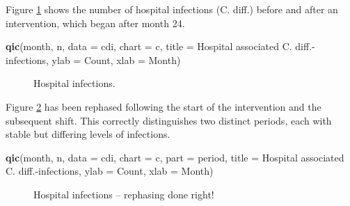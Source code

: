 \documentclass[
]{book}
\makeatletter
\newenvironment{Shaded}{\begin{snugshade}}{\end{snugshade}}
\newcommand{\AttributeTok}[1]{\textcolor[rgb]{0.13,0.29,0.53}{#1}}
\newcommand{\FunctionTok}[1]{\textcolor[rgb]{0.13,0.29,0.53}{\textbf{#1}}}
\newcommand{\NormalTok}[1]{#1}
\newcommand{\StringTok}[1]{\textcolor[rgb]{0.31,0.60,0.02}{#1}}
\newcommand*\pandocbounded[1]{%
  \sbox\pandoc@box{#1}%
  \Gscale@div\@tempa{\textheight}{\dimexpr\ht\pandoc@box+\dp\pandoc@box\relax}%
  \Gscale@div\@tempb{\linewidth}{\wd\pandoc@box}%
  \ifdim\@tempb\p@<\@tempa\p@\let\@tempa\@tempb\fi%
  \ifdim\@tempa\p@<\p@\scalebox{\@tempa}{\usebox\pandoc@box}%
  \else\usebox{\pandoc@box}%
  \fi%
}
\makeatother
\begin{document}
Figure \ref{fig:pitfalls-fig1} shows the number of hospital infections (C. diff.) before and after an intervention, which began after month 24.

\begin{Shaded}
\begin{Highlighting}[]
\FunctionTok{qic}\NormalTok{(month, n,}
    \AttributeTok{data  =}\NormalTok{ cdi,}
    \AttributeTok{chart =} \StringTok{\textquotesingle{}c\textquotesingle{}}\NormalTok{,}
    \AttributeTok{title =} \StringTok{\textquotesingle{}Hospital associated C. diff.{-}infections\textquotesingle{}}\NormalTok{,}
    \AttributeTok{ylab  =} \StringTok{\textquotesingle{}Count\textquotesingle{}}\NormalTok{,}
    \AttributeTok{xlab  =} \StringTok{\textquotesingle{}Month\textquotesingle{}}\NormalTok{)}
\end{Highlighting}
\end{Shaded}

\begin{figure}
\centering
\pandocbounded{}
\caption{\label{fig:pitfalls-fig1}Hospital infections.}
\end{figure}

Figure \ref{fig:pitfalls-fig2} has been rephased following the start of the intervention and the subsequent shift. This correctly distinguishes two distinct periods, each with stable but differing levels of infections.

\begin{Shaded}
\begin{Highlighting}[]
\FunctionTok{qic}\NormalTok{(month, n,}
    \AttributeTok{data  =}\NormalTok{ cdi,}
    \AttributeTok{chart =} \StringTok{\textquotesingle{}c\textquotesingle{}}\NormalTok{,}
    \AttributeTok{part  =}\NormalTok{ period,}
    \AttributeTok{title =} \StringTok{\textquotesingle{}Hospital associated C. diff.{-}infections\textquotesingle{}}\NormalTok{,}
    \AttributeTok{ylab  =} \StringTok{\textquotesingle{}Count\textquotesingle{}}\NormalTok{,}
    \AttributeTok{xlab  =} \StringTok{\textquotesingle{}Month\textquotesingle{}}\NormalTok{)}
\end{Highlighting}
\end{Shaded}

\begin{figure}
\centering
\pandocbounded{}
\caption{\label{fig:pitfalls-fig2}Hospital infections -- rephasing done right!}
\end{figure}
\end{document}
